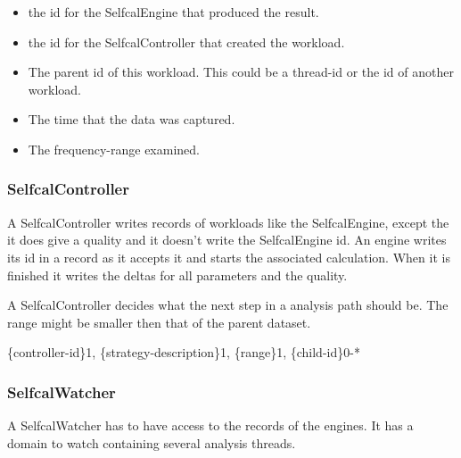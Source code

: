 \documentclass[]{lofar}
\begin{document}
        \begin{itemize}

	  \item 

            the id for the SelfcalEngine that produced the result.

	  \item 

            the id for the SelfcalController that created the workload.

	  \item 

            The parent id of this workload. This could be a thread-id
            or the id of another workload.

	  \item 

            The time that the data was captured.

	  \item 

            The frequency-range examined.

        \end{itemize}

      \subsubsection{SelfcalController}
      \label{subsubsec:SelfcalController}\hypertarget{subsubsec:SelfcalController}{}

        A SelfcalController writes records of workloads like the
        SelfcalEngine, except the it does give a quality and it
        doesn't write the SelfcalEngine id. An engine writes its id in
        a record as it accepts it and starts the associated
        calculation. When it is finished it writes the deltas for all
        parameters and the quality.

        A SelfcalController decides what the next step in a analysis
        path should be. The range might be smaller then that of the
        parent dataset.

        \{controller-id\}1, \{strategy-description\}1, \{range\}1, \{child-id\}0-*

      \subsubsection{SelfcalWatcher}
      \label{subsubsec:SelfcalWatcher}\hypertarget{subsubsec:SelfcalWatcher}{}

        A SelfcalWatcher has to have access to the records of the
        engines. It has a domain to watch containing several analysis
        threads.
\end{document}
